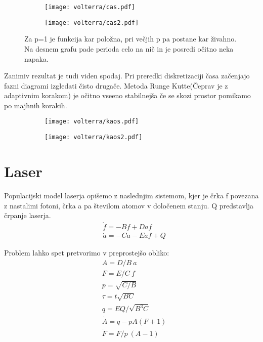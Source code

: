 \documentclass{article}
\begin{document}
\begin{figure}[H]
\centering
\begin{subfigure}{.49\textwidth}
\texttt{[image: volterra/cas.pdf]}
\end{subfigure}
\begin{subfigure}{.49\textwidth}
\texttt{[image: volterra/cas2.pdf]}
\end{subfigure}
\caption*{Za p=1 je funkcija kar položna, pri večjih p pa postane kar živahno. Na desnem grafu pade perioda celo na nič in je posredi očitno neka napaka.}
\end{figure}

Zanimiv rezultat je tudi viden spodaj. Pri preredki diskretizaciji časa začenjajo fazni diagrami izgledati čisto drugače. Metoda Runge Kutte(Čeprav je z adaptivnim korakom) je očitno vseeno stabilnejša če se skozi prostor pomikamo po majhnih korakih.
\begin{figure}[H]
\centering
\begin{subfigure}{.49\textwidth}
\texttt{[image: volterra/kaos.pdf]}
\end{subfigure}
\begin{subfigure}{.49\textwidth}
\texttt{[image: volterra/kaos2.pdf]}
\end{subfigure}
\end{figure}
\newpage
\section{Laser}
Populacijski model laserja opišemo z naslednjim sistemom, kjer je črka f povezana z nastalimi fotoni, črka a pa številom atomov v določenem stanju. Q predstavlja črpanje laserja.
\begin{align*}
&\dot{f} = -B f + Daf \\
&\dot{a} = -C a - E a f + Q
\end{align*}

Problem lahko spet pretvorimo v preprostejšo obliko:
\begin{align*}
&A = D/B \ a \\
&F = E/C \ f \\
&p = \sqrt{C/B}\\
&\tau = t\sqrt{BC}\\
&q = EQ/\sqrt{B^3 C} \\
&\dot{A} = q - pA(F+1) \\
&\dot{F} = F/p\  (A-1)
\end{align*}
\end{document}
